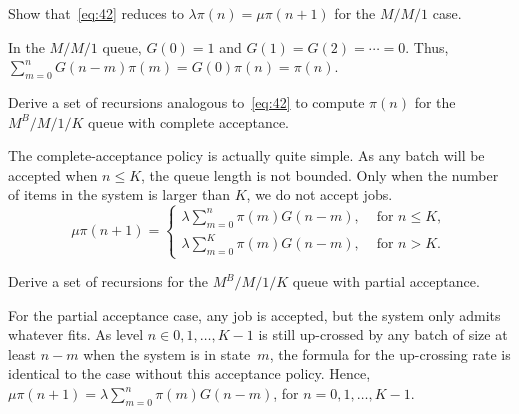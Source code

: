 \documentclass[queueing-book.tex]{subfiles}
\begin{document}
\begin{exercise}\label{ex:27}
 Show that~\cref{eq:42} reduces to $\lambda \pi(n) = \mu \pi(n+1)$ for the $M/M/1$ case.
\begin{solution}
  In the $M/M/1$ queue, $G(0)=1$ and $G(1)=G(2)=\cdots = 0$.
  Thus, $\sum_{m=0}^n G(n-m) \pi(m) = G(0)\pi(n)=\pi(n)$.
\end{solution}
\end{exercise}



\begin{exercise}\label{ex:9}
 Derive a set of recursions analogous to~\cref{eq:42} to compute $\pi(n)$ for the $M^B/M/1/K$ queue with complete acceptance.
\begin{solution}
 The complete-acceptance policy is actually quite simple. As any
 batch will be accepted when $n\leq K$, the queue length is not
 bounded. Only when the number of items in the system is larger than
 $K$, we do not accept jobs.
 \begin{equation*}
 \mu \pi(n+1) =
 \begin{cases}
 \lambda \sum_{m=0}^n \pi(m) G(n-m), & \text{ for } n\leq K,\\
 \lambda \sum_{m=0}^K \pi(m) G(n-m), & \text{ for } n> K.
 \end{cases}
 \end{equation*}
\end{solution}
\end{exercise}



\begin{exercise}\label{ex:45}
 Derive a set of recursions for the $M^B/M/1/K$ queue with partial acceptance.
\begin{solution}
  For the partial acceptance case, any job is accepted, but the system only admits whatever fits.
  As level $n\in {0,1,\ldots,K-1}$ is still up-crossed by any batch of size at least $n-m$ when the system is in state~$m$, the formula for the up-crossing rate is identical to the case without this acceptance policy.
  Hence, $\mu \pi(n+1) = \lambda \sum_{m=0}^n \pi(m) G(n-m)$, for $n=0,1,\ldots, K-1$.
\end{solution}
\end{exercise}
\end{document}
